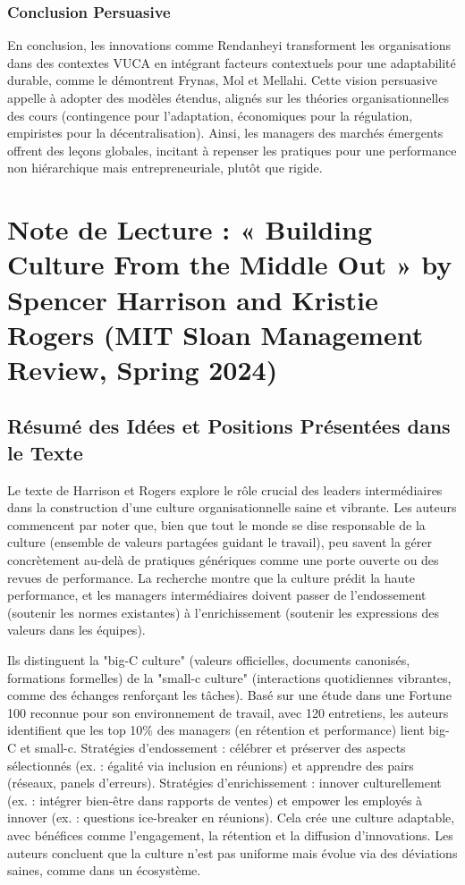 \documentclass{rapportECL}
\begin{document}
\subsubsection{Conclusion Persuasive}
En conclusion, les innovations comme Rendanheyi transforment les organisations dans des contextes VUCA en intégrant facteurs contextuels pour une adaptabilité durable, comme le démontrent Frynas, Mol et Mellahi. Cette vision persuasive appelle à adopter des modèles étendus, alignés sur les théories organisationnelles des cours (contingence pour l'adaptation, économiques pour la régulation, empiristes pour la décentralisation). Ainsi, les managers des marchés émergents offrent des leçons globales, incitant à repenser les pratiques pour une performance non hiérarchique mais entrepreneuriale, plutôt que rigide.

\section{Note de Lecture : « Building Culture From the Middle Out » by Spencer Harrison and Kristie Rogers (MIT Sloan Management Review, Spring 2024)}

\subsection{Résumé des Idées et Positions Présentées dans le Texte}
Le texte de Harrison et Rogers explore le rôle crucial des leaders intermédiaires dans la construction d'une culture organisationnelle saine et vibrante. Les auteurs commencent par noter que, bien que tout le monde se dise responsable de la culture (ensemble de valeurs partagées guidant le travail), peu savent la gérer concrètement au-delà de pratiques génériques comme une porte ouverte ou des revues de performance. La recherche montre que la culture prédit la haute performance, et les managers intermédiaires doivent passer de l'endossement (soutenir les normes existantes) à l'enrichissement (soutenir les expressions des valeurs dans les équipes).

Ils distinguent la "big-C culture" (valeurs officielles, documents canonisés, formations formelles) de la "small-c culture" (interactions quotidiennes vibrantes, comme des échanges renforçant les tâches). Basé sur une étude dans une Fortune 100 reconnue pour son environnement de travail, avec 120 entretiens, les auteurs identifient que les top 10\% des managers (en rétention et performance) lient big-C et small-c. Stratégies d'endossement : célébrer et préserver des aspects sélectionnés (ex. : égalité via inclusion en réunions) et apprendre des pairs (réseaux, panels d'erreurs). Stratégies d'enrichissement : innover culturellement (ex. : intégrer bien-être dans rapports de ventes) et empower les employés à innover (ex. : questions ice-breaker en réunions). Cela crée une culture adaptable, avec bénéfices comme l'engagement, la rétention et la diffusion d'innovations. Les auteurs concluent que la culture n'est pas uniforme mais évolue via des déviations saines, comme dans un écosystème.
\end{document}
